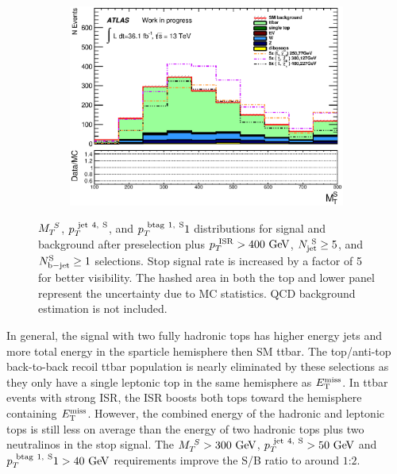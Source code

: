 \begin{figure}[h!]
\begin{center}
\begin{subfigure}[a]{0.45\textwidth}
    	 \includegraphics[width=\textwidth]{figures/plotSR/SR_ND1_MS_3SR.eps}\hspace{0.05\textwidth}
                \caption{ }
    \end{subfigure}
     \caption[$\MS$, $\pTjV$, and $\pTbV1$ distributions for signal and background after preselection plus $\PTISR > 400 \gev$, $\NjV \ge 5$, and $\nBJetS \ge 1$ selections]{ $\MS$, $\pTjV$, and $\pTbV1$ distributions for signal and background after preselection plus $\PTISR > 400 \gev$, $\NjV \ge 5$, and $\nBJetS \ge 1$ selections.  Stop signal rate is increased by a factor of 5 for better visibility. The hashed area in both the top and lower panel represent the uncertainty due to MC statistics.  QCD background estimation is not included.  }
  \label{fig:SR:jetMulti2}
    \end{center}
\end{figure}

\indent In general, the signal with two fully hadronic tops has higher energy jets and more total energy in the sparticle hemisphere then SM ttbar.  The top/anti-top back-to-back recoil ttbar population is nearly eliminated by these selections as they only have a single leptonic top in the same hemisphere as $E_{\mathrm{T}}^{\mathrm{miss}}$.  In ttbar events with strong ISR, the ISR boosts both tops toward the hemisphere containing $E_{\mathrm{T}}^{\mathrm{miss}}$.  However, the combined energy of the hadronic and leptonic tops is still less on average than the energy of two hadronic tops plus two neutralinos in the stop signal.  The $\MS > 300 \gev$, $\pTjV > 50 \gev$ and $\pTbV1 > 40 \gev$ requirements improve the S/B ratio to around $1$:$2$. \\

